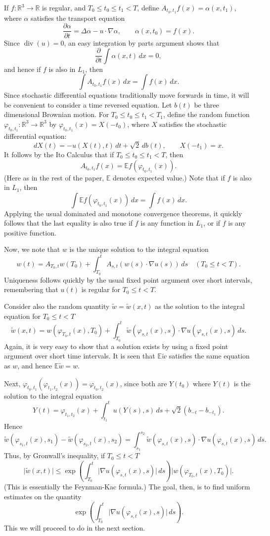 \documentclass[12pt]{amsart}
\theoremstyle{remark}
\newcommand{\E}{{\mathbb E}}
\newcommand{\R}{{\mathbb R}}
\newcommand{\smodo}[1]{{\mathopen|#1\mathclose|}}
\DeclareMathOperator{\divergence}{div}
\begin{document}
If $f\colon\R^3 \to \R$ is regular, and
$T_0 \le t_0 \le t_1 < T$,
define $A_{t_0,t_1} f(x) = \alpha(x,t_1)$, where 
$\alpha$ satisfies the transport equation
$$ \frac{\partial\alpha}{\partial t} = \Delta \alpha - u\cdot\nabla \alpha,
   \qquad
   \alpha(x,t_0) = f(x) .$$
Since $\divergence(u) = 0$, an easy integration by parts argument shows
that
$$ \frac\partial{\partial t} \int \alpha(x,t) \, dx = 0 ,$$
and hence if $f$ is also in $L_1$, then
$$ \int A_{t_0,t_1} f(x) \, dx = \int f(x) \, dx .$$
Since stochastic
differential equations traditionally move forwards in time, it will be 
convenient to consider a time reversed equation.
Let $b(t)$ be three dimensional Brownian motion.
For $T_0 \le t_0 \le t_1 < T_1$, define the random function
$\varphi_{t_0,t_1}\colon\R^3\to\R^3$ by
$\varphi_{t_0,t_1}(x) = X(-t_0)$, where $X$ satisfies the 
stochastic differential equation:
$$ dX(t) = -u(X(t),t) \, dt + \sqrt2 \, db(t),
   \qquad
   X(-t_1) = x .$$
It follows by the Ito Calculus \cite{karatzas-shreve} that
if $T_0 \le t_0 \le t_1 < T$, then
$$ A_{t_0,t_1} f(x) = \E f(\varphi_{t_0,t_1}(x)) .$$
(Here as in the rest of the paper, $\E$ denotes expected value.)
Note that if $f$ is also in $L_1$, then
$$ \int \E f(\varphi_{t_0,t_1}(x)) \, dx = \int f(x) \, dx .$$
Applying the usual dominated and monotone convergence theorems, it
quickly follows that the last equality is also true if $f$ is any
function in $L_1$, or if $f$
is any positive function.

Now, we note that $w$ is the unique solution to the integral
equation
$$ w(t) = A_{T_0,t} w(T_0) + 
   \int_{T_0}^t A_{s,t} (w(s) \cdot \nabla u(s)) \, ds 
   \quad (T_0 \le t < T).$$
Uniqueness follows quickly by the usual fixed point argument
over short intervals, 
remembering that $u(t)$ is regular for $T_0 \le t < T$.

Consider also the random quantity
$\tilde w = \tilde w(x,t)$ as the solution to the integral equation
for $T_0 \le t < T$
$$ \tilde w(x,t) = w(\varphi_{T_0,t}(x),T_0) +
   \int_{T_0}^t \tilde 
   w(\varphi_{s,t}(x),s) \cdot \nabla u(\varphi_{s,t}(x),s) \, ds .$$
Again, 
it is very easy to show that a solution exists by using a fixed point
argument over short time intervals.
It is seen that $\E\tilde w$ satisfies the same equation as $w$, and
hence $\E \tilde w = w$.

Next, 
$\varphi_{t_0,t_1}(\varphi_{t_1,t_2}(x)) = \varphi_{t_0,t_2}(x)$,
since both are $Y(t_0)$ where $Y(t)$ is the solution to the integral equation
$$ Y(t) = \varphi_{t_1,t_2}(x) + \int_{t_1}^{t} u(Y(s),s)\, ds
       + \sqrt 2(b_{-t}-b_{-t_1}) .$$
Hence
$$ \tilde w(\varphi_{s_1,t}(x),s_1) - \tilde w(\varphi_{s_2,t}(x),s_2)
   =
   \int_{s_1}^{s_2} \tilde 
   w(\varphi_{s,t}(x),s) \cdot \nabla u(\varphi_{s,t}(x),s) \, ds .$$
Thus,
by Gronwall's inequality, if $T_0 \le t < T$
$$ \smodo{\tilde w(x,t)}
   \le
   \exp\left(\int_{T_0}^t \smodo{\nabla u(\varphi_{s,t}(x),s)} \, ds\right)
   \smodo{w(\varphi_{T_0,t}(x),T_0)} .$$
(This is essentially the Feynman-Kac formula.)
The goal, then, is to find uniform estimates on the quantity
$$ \exp\left(\int_{T_0}^t \smodo{\nabla u(\varphi_{s,t}(x),s)} \, ds\right) .$$
This we will proceed to do in the next section.
\end{document}
